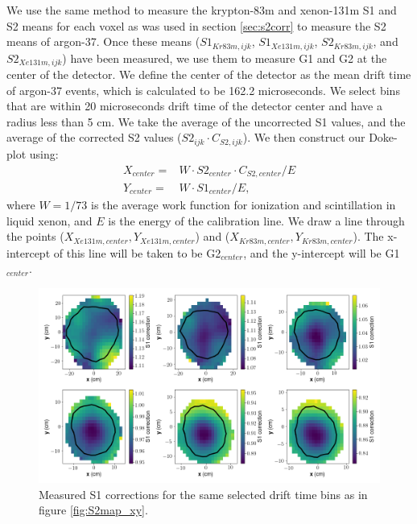 We use the same method to measure the krypton-83m and xenon-131m S1 and S2 means for each voxel as was used in section \ref{sec:s2corr} to measure the S2 means of argon-37. Once these means ($S1_{Kr83m,ijk}$, $S1_{Xe131m,ijk}$, $S2_{Kr83m,ijk}$, and $S2_{Xe131m,ijk}$) have been measured, we use them to measure G1 and G2 at the center of the detector. We define the center of the detector as the mean drift time of argon-37 events, which is calculated to be 162.2 microseconds. We select bins that are within 20 microseconds drift time of the detector center and have a radius less than 5 cm. We take the average of the uncorrected S1 values, and the average of the corrected S2 values ($S2_{ijk}\cdot C_{S2,ijk}$). We then construct our Doke-plot using:
\begin{equation}
\begin{split}
X_{center}=& W\cdot S2_{center}\cdot C_{S2,center}/E\\
Y_{center}=& W\cdot S1_{center}/E,
\end{split}
\end{equation}
where $W=1/73$ is the average work function for ionization and scintillation in liquid xenon, and $E$ is the energy of the calibration line. We draw a line through the points ($X_{Xe131m,center},Y_{Xe131m,center}$) and ($X_{Kr83m,center},Y_{Kr83m,center}$). The x-intercept of this line will be taken to be G2$_{center}$, and the y-intercept will be G1$_{center}$.
\begin{figure}[h!]
\centering
\includegraphics[width=150mm]{Figures/S1corr_xy.png}
\caption{Measured S1 corrections for the same selected drift time bins as in figure \ref{fig:S2map_xy}. }
\label{fig:S1corr_xy} 
\end{figure}


